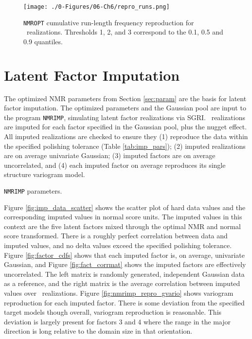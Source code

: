 \begin{figure}[htb!]
    \centering
    \texttt{[image: ./0-Figures/06-Ch6/repro\_runs.png]}
    \caption{\texttt{NMROPT} cumulative run-length frequency reproduction for \csnreals \ realizations. Thresholds 1, 2, and 3 correspond to the 0.1, 0.5 and 0.9 quantiles.}
    \label{fig:nmropt_repro_runs}
\end{figure}


\FloatBarrier
\section{Latent Factor Imputation}
\label{sec:fact_imp}

The optimized \gls{NMR} parameters from Section \ref{sec:param} are the basis for latent factor imputation. The optimized parameters and the Gaussian pool are input to the program \texttt{NMRIMP}, simulating latent factor realizations via \gls{SGRI}. \csnreals \ realizations are imputed for each factor specified in the Gaussian pool, plus the nugget effect. All imputed realizations are checked to ensure they (1) reproduce the data within the specified polishing tolerance (Table \ref{tab:imp_pars}); (2) imputed realizations are on average univariate Gaussian; (3) imputed factors are on average uncorrelated, and (4) each imputed factor on average reproduces its single structure variogram model.

\begin{table}[!htb]
    \centering
    \caption{\texttt{NMRIMP} parameters.}
    \resizebox{0.9\width}{!}{}
    \label{tab:imp_pars}
\end{table}

Figure \ref{fig:imp_data_scatter} shows the scatter plot of hard data values and the corresponding imputed values in normal score units. The imputed values in this context are the five latent factors mixed through the optimal \gls{NMR} and normal score transformed. There is a roughly perfect correlation between data and imputed values, and no delta values exceed the specified polishing tolerance. Figure \ref{fig:factor_cdfs} shows that each imputed factor is, on average, univariate Gaussian, and Figure \ref{fig:fact_corrmat} shows the imputed factors are effectively uncorrelated. The left matrix is randomly generated, independent Gaussian data as a reference, and the right matrix is the average correlation between imputed values over \csnreals \ realizations. Figure \ref{fig:nmrimp_repro_gvario} shows variogram reproduction for each imputed factor. There is some deviation from the specified target models though overall, variogram reproduction is reasonable. This deviation is largely present for factors 3 and 4 where the range in the major direction is long relative to the domain size in that orientation.


